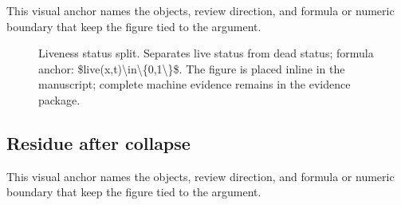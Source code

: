 This visual anchor names the objects, review direction, and formula or numeric boundary that keep the figure tied to the argument.


\begin{figure}[htbp]

\centering


\caption{Liveness status split. Separates live status from dead status; formula anchor: \$live(x,t)\textbackslash{}in\textbackslash{}\{0,1\textbackslash{}\}\$. The figure is placed inline in the manuscript; complete machine evidence remains in the evidence package.}

\label{fig:r005-inline-28a_oc133_inline_figures_foundation-2}

\end{figure}

\subsection{Residue after collapse}

This visual anchor names the objects, review direction, and formula or numeric boundary that keep the figure tied to the argument.


